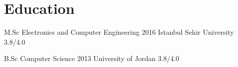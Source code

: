 
\section{Education}
\sectionStart
  
    
    \educationItem
    {M.Sc} 
    {Electronics and Computer Engineering} 
    {2016}
    {Istanbul Sehir University} 
    {3.8/4.0}
    
    \educationItem
    {B.Sc} 
    {Computer Science} 
    {2013}
    {University of Jordan} 
    {3.8/4.0}
\sectionEnd